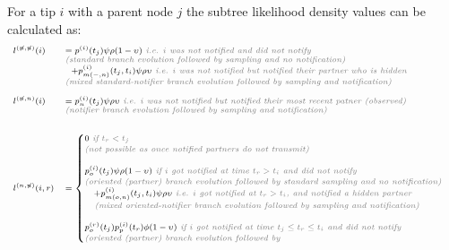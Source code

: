 \documentclass[a4paper,10pt]{article}
\begin{document}
For a tip $i$ with a parent node $j$ the subtree likelihood density values can be calculated as:
\begin{equation}
\scriptsize
\begin{array}{ll}
l^{(\not{n},\not{n})}(i) &= p^{(i)}(t_j)\psi\rho (1-\upsilon) \textit{\color{gray} ~i.e. $i$ was not notified and did not notify}\\
& \textit{\color{gray} (standard branch evolution followed by sampling and no notification)}\\
&~~+p_{m(-,n)}^{(i)}(t_j,t_i)\psi\rho\upsilon \textit{\color{gray} ~i.e. $i$ was not notified but notified their partner who is hidden}\\
& \textit{\color{gray} (mixed standard-notifier branch evolution followed by sampling and notification)}\\
\\
l^{(\not{n},n)}(i) &= p_n^{(i)}(t_j)\psi\rho
\upsilon \textit{\color{gray} ~i.e. $i$ was not notified but notified their most recent patner (observed)}\\
& \textit{\color{gray} (notifier branch evolution followed by sampling and notification)}\\
&~~\\
\\
l^{(n,\not{n})}(i,r) &= \begin{cases}
0 \textit{\color{gray} ~if $t_r < t_j$}\\
\textit{\color{gray} (not possible as once notified partners do not transmit)}\\
\\
p_o^{(i)}(t_j)\psi\rho(1 - \upsilon) \textit{\color{gray} ~if $i$ got notified at time $t_r > t_i$ and did not notify}\\
\textit{\color{gray} (oriented (partner) branch evolution followed by standard sampling and no notification)}\\
~~~+p_{m(o,n)}^{(i)}(t_j,t_i)\psi\rho\upsilon \textit{\color{gray} ~i.e. $i$ got notified at $t_r > t_i$, and notified a hidden partner}\\
 \textit{\color{gray} ~~~(mixed oriented-notifier branch evolution followed by sampling and notification)}\\
\\
p_o^{(r)}(t_j) p_p^{(i)}(t_r) \phi (1-\upsilon) \textit{\color{gray} ~if $i$ got notified at time $t_j \leq t_r \leq t_i$ and did not notify}\\
\textit{\color{gray} (oriented (partner) branch evolution followed by} \\

\end{cases}
\end{array}
\end{equation}
\end{document}
